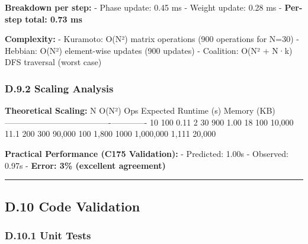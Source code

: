 \documentclass[
]{article}
\begin{document}
\textbf{Breakdown per step:} - Phase update: 0.45 ms - Weight update:
0.28 ms - \textbf{Per-step total: 0.73 ms}

\textbf{Complexity:} - Kuramoto: O(N²) matrix operations (900 operations
for N=30) - Hebbian: O(N²) element-wise updates (900 updates) -
Coalition: O(N² + N·k) DFS traversal (worst case)

\subsubsection{D.9.2 Scaling Analysis}\label{d.9.2-scaling-analysis}

\textbf{Theoretical Scaling:} \textbar{} N \textbar{} O(N²) Ops
\textbar{} Expected Runtime (s) \textbar{} Memory (KB) \textbar{}
\textbar------\textbar-----------\textbar----------------------\textbar-------------\textbar{}
\textbar{} 10 \textbar{} 100 \textbar{} 0.11 \textbar{} 2 \textbar{}
\textbar{} 30 \textbar{} 900 \textbar{} 1.00 \textbar{} 18 \textbar{}
\textbar{} 100 \textbar{} 10,000 \textbar{} 11.1 \textbar{} 200
\textbar{} \textbar{} 300 \textbar{} 90,000 \textbar{} 100 \textbar{}
1,800 \textbar{} \textbar{} 1000 \textbar{} 1,000,000 \textbar{} 1,111
\textbar{} 20,000 \textbar{}

\textbf{Practical Performance (C175 Validation):} - Predicted: 1.00s -
Observed: 0.97s - \textbf{Error: 3\% (excellent agreement)}

\begin{center}\rule{0.5\linewidth}{0.5pt}\end{center}

\subsection{D.10 Code Validation}\label{d.10-code-validation}

\subsubsection{D.10.1 Unit Tests}\label{d.10.1-unit-tests}
\end{document}
